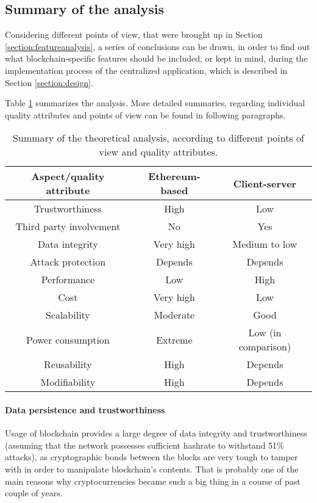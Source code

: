 \subsection{Summary of the analysis} \label{section:analysisconclusion}
Considering different points of view, that were brought up in Section \ref{section:featureanalysis}, a series of conclusions can be drawn, in order to find out what blockchain-specific features should be included, or kept in mind, during the implementation process of the centralized application, which is described in Section \ref{section:design}. 

Table \ref{tab:analysisoutline} summarizes the analysis. More detailed summaries, regarding individual quality attributes and points of view can be found in following paragraphs.

\begin{table}[H]
\centering
\begin{tabular}{| c | c | c |}
\hline
\textbf{Aspect/quality attribute} & \textbf{Ethereum-based} & \textbf{Client-server} \\
\hline
Trustworthiness & High & Low \\
Third party involvement & No & Yes \\
Data integrity & Very high & Medium to low \\
Attack protection & Depends & Depends \\
Performance & Low & High \\
Cost & Very high & Low \\
Scalability & Moderate & Good \\
Power consumption & Extreme & Low (in comparison) \\
Reusability & High & Depends \\
Modifiability & High & Depends \\
\hline
\end{tabular}
\caption{Summary of the theoretical analysis, according to different points of view and quality attributes.}
\label{tab:analysisoutline}
\end{table}

\paragraph{Data persistence and trustworthiness}
Usage of blockchain provides a large degree of data integrity and trustworthiness (assuming that the network possesses sufficient hashrate to withstand 51\% attacks), as cryptographic bonds between the blocks are very tough to tamper with in order to manipulate blockchain's contents. That is probably one of the main reasons why cryptocurrencies became such a big thing in a course of past couple of years.


